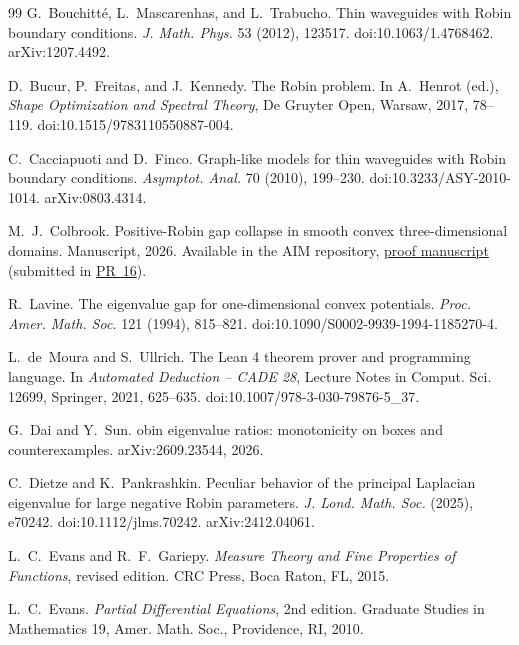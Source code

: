 \documentclass[11pt,a4paper]{article}
\numberwithin{equation}{section}
\theoremstyle{paperplain}
\theoremstyle{remark}
\begin{document}
\begin{thebibliography}{99}
G.~Bouchitt\'e, L.~Mascarenhas, and L.~Trabucho.
\newblock Thin waveguides with {R}obin boundary conditions.
\newblock \emph{J. Math. Phys.} 53 (2012), 123517.
\newblock doi:10.1063/1.4768462. arXiv:1207.4492.

D.~Bucur, P.~Freitas, and J.~Kennedy.
\newblock The {R}obin problem.
\newblock In A.~Henrot (ed.), \emph{Shape Optimization and Spectral Theory},
  De Gruyter Open, Warsaw, 2017, 78--119.
\newblock doi:10.1515/9783110550887-004.

C.~Cacciapuoti and D.~Finco.
\newblock Graph-like models for thin waveguides with {R}obin boundary
  conditions.
\newblock \emph{Asymptot. Anal.} 70 (2010), 199--230.
\newblock doi:10.3233/ASY-2010-1014. arXiv:0803.4314.

M.~J.~Colbrook.
\newblock Positive-Robin gap collapse in smooth convex three-dimensional domains.
\newblock Manuscript, 2026. Available in the AIM repository,
\href{https://github.com/MColbrook/AIM/blob/main/research/solutions/021-robin-gap-counterexample/robin_gap_021.pdf}{proof manuscript}
(submitted in \href{https://github.com/MColbrook/AIM/pull/16}{PR~16}).

R.~Lavine.
\newblock The eigenvalue gap for one-dimensional convex potentials.
\newblock \emph{Proc. Amer. Math. Soc.} 121 (1994), 815--821.
\newblock doi:10.1090/S0002-9939-1994-1185270-4.

L.~de~Moura and S.~Ullrich.
\newblock The {L}ean 4 theorem prover and programming language.
\newblock In \emph{Automated Deduction -- CADE 28}, Lecture Notes in Comput.
  Sci. 12699, Springer, 2021, 625--635.
\newblock doi:10.1007/978-3-030-79876-5\_37.

G.~Dai and Y.~Sun.
obin eigenvalue ratios: monotonicity on boxes and
  counterexamples.
\newblock arXiv:2609.23544, 2026.

C.~Dietze and K.~Pankrashkin.
\newblock Peculiar behavior of the principal {L}aplacian eigenvalue for
  large negative {R}obin parameters.
\newblock \emph{J. Lond. Math. Soc.} (2025), e70242.
\newblock doi:10.1112/jlms.70242. arXiv:2412.04061.

L.~C.~Evans and R.~F.~Gariepy.
\newblock \emph{Measure Theory and Fine Properties of Functions}, revised
  edition.
\newblock CRC Press, Boca Raton, FL, 2015.

L.~C.~Evans.
\newblock \emph{Partial Differential Equations}, 2nd edition.
\newblock Graduate Studies in Mathematics 19, Amer. Math. Soc., Providence,
  RI, 2010.


\end{thebibliography}
\end{document}
